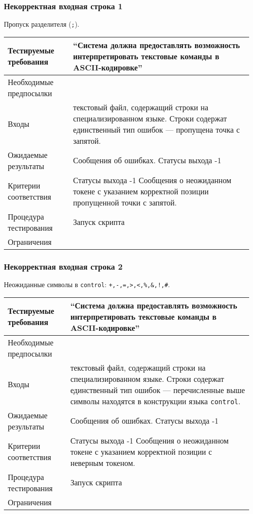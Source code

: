 \documentclass[a4paper, 12pt]{article}
\begin{document}
\subsubsection{Некорректная входная строка 1} %
Пропуск разделителя ({\tt ;}).

\begin{table}[H]
	\centering

	\begin{tabular}{|l|p{4in}|}
		\hline
		Тестируемые требования	&``Система должна предоставлять возможность интерпретировать текстовые
		команды в ASCII-кодировке''\\
		\hline
		Необходимые предпосылки	&\\
		\hline
		Входы			&текстовый файл, содержащий строки на специализированном языке.\newline
		Строки содержат единственный тип ошибок --- пропущена точка с запятой.\\
		\hline
		Ожидаемые результаты	&Сообщения об ошибках. Статусы выхода -1\\
		\hline
		Критерии соответствия	&Статусы выхода -1\newline
		Сообщения о неожиданном токене с указанием корректной позиции 
		пропущенной точки с запятой.\\
		\hline
		Процедура тестирования	&Запуск скрипта\\
		\hline
		Ограничения		&\\
		\hline
	\end{tabular}

\end{table}

\subsubsection{Некорректная входная строка 2} %
Неожиданные символы в {\tt control}: {\tt +,-,=,>,<,\%,\&,!,\#}.
	\begin{table}[H]
		\centering
		\begin{tabular}{|l|p{4in}|}
			\hline
			Тестируемые требования	&``Система должна предоставлять возможность интерпретировать текстовые
			команды в ASCII-кодировке''\\
			\hline
			Необходимые предпосылки	&\\
			\hline
			Входы			&текстовый файл, содержащий строки на специализированном языке.\newline
			Строки содержат единственный тип ошибок --- перечисленные выше символы находятся
			в конструкции языка {\tt control}.\\
			\hline
			Ожидаемые результаты	&Сообщения об ошибках. Статусы выхода -1\\
			\hline
			Критерии соответствия	&Статусы выхода -1\newline
			Сообщения о неожиданном токене с указанием корректной позиции 
			с неверным токеном.\\
			\hline
			Процедура тестирования	&Запуск скрипта\\
			\hline
			Ограничения		&\\
			\hline
		\end{tabular}
	\end{table}
\end{document}
